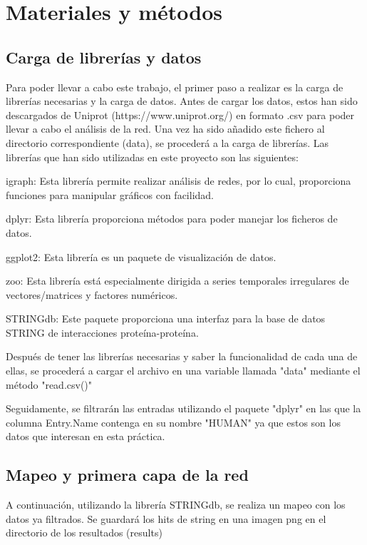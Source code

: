 \section{Materiales y métodos}
\subsection{Carga de librerías y datos}
Para poder llevar a cabo este trabajo, el primer paso a realizar es la carga de librerías necesarias y la carga de datos. Antes de cargar los datos, estos han sido descargados de Uniprot (https://www.uniprot.org/) en formato .csv para poder llevar a cabo el análisis de la red.
Una vez ha sido añadido este fichero al directorio correspondiente (data), se procederá a la carga de librerías.
Las librerías que han sido utilizadas en este proyecto son las siguientes:
\begin{itemsize}
	\item igraph: Esta librería permite realizar análisis de redes, por lo cual, proporciona funciones para manipular gráficos con facilidad.
	\item dplyr: Esta librería proporciona métodos para poder manejar los ficheros de datos.
	\item ggplot2: Esta librería es un paquete de visualización de datos.
	\item zoo: Esta librería está especialmente dirigida a series temporales irregulares de vectores/matrices y factores numéricos. 
	\item STRINGdb: Este paquete proporciona una interfaz para la base de datos STRING de interacciones proteína-proteína.
\end{itemsize}

Después de tener las librerías necesarias y saber la funcionalidad de cada una de ellas, se procederá a cargar el archivo en una variable llamada "data" mediante el método "read.csv()"

Seguidamente, se filtrarán las entradas utilizando el paquete "dplyr" en las que la columna Entry.Name contenga en su nombre "HUMAN" ya que estos son los datos que interesan en esta práctica.

\subsection{Mapeo y primera capa de la red}
A continuación, utilizando la librería STRINGdb, se realiza un mapeo con los datos ya filtrados. Se guardará los hits de string en una imagen png en el directorio de los resultados (results)

